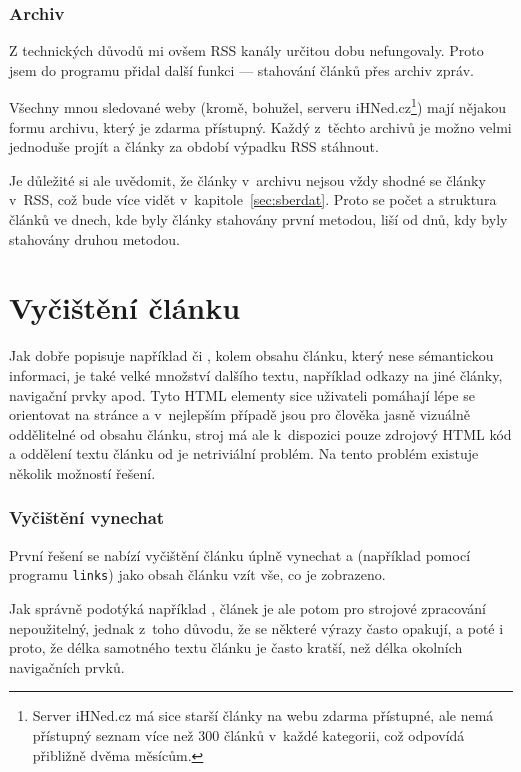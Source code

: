 \documentclass[12pt,a4paper]{report}
\begin{document}
\subsubsection{Archiv}
Z technických důvodů mi ovšem RSS kanály určitou dobu nefungovaly. Proto jsem do programu přidal další funkci --- stahování článků přes archiv zpráv.

Všechny mnou sledované weby (kromě, bohužel, serveru iHNed.cz\footnote{Server iHNed.cz má sice starší články na webu zdarma přístupné, ale nemá přístupný seznam více než 300 článků v~každé kategorii, což odpovídá přibližně dvěma měsícům.}) mají nějakou formu archivu, který je zdarma přístupný. Každý z~těchto archivů je možno velmi jednoduše projít a články za období výpadku RSS stáhnout.

Je důležité si ale uvědomit, že články v~archivu nejsou vždy shodné se články v~RSS, což bude více vidět v~kapitole~\ref{sec:sberdat}. Proto se počet a struktura článků ve dnech, kde byly články stahovány první metodou, liší od dnů, kdy byly stahovány druhou metodou.



\section{Vyčištění článku}
Jak dobře popisuje například \cite{eliminating} či \cite{discovering}, kolem  obsahu článku, který nese sémantickou informaci, je také velké množství dalšího textu, například odkazy na jiné články, navigační prvky apod. Tyto HTML elementy sice uživateli pomáhají lépe se orientovat na stránce a v~nej\-lep\-ším případě jsou pro člověka jasně vizuálně oddělitelné od obsahu článku, stroj má ale k~dispozici pouze zdrojový HTML kód a od\-dělení  textu článku od  je netriviální problém. Na tento problém existuje několik možností řešení.

\subsubsection{Vyčištění vynechat}
První řešení se nabízí vyčištění článku úplně vynechat a (například pomocí programu \texttt{links}) jako obsah článku vzít vše, co je zobrazeno.

Jak správně podotýká například \cite{discovering}, článek je ale potom pro strojové zpracování nepoužitelný, jednak z~toho důvodu, že se některé výrazy často opakují, a poté i proto, že délka samotného textu článku je často kratší, než délka okolních navigačních prvků.
\end{document}
